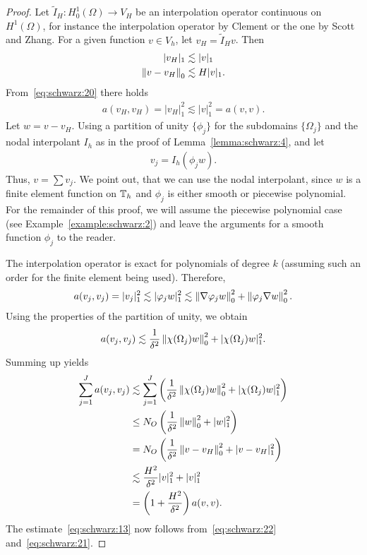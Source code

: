 \begin{proof}
  Let $\tilde I_H: H^1_0(\Omega) \to V_H$ be an interpolation operator
  continuous on $H^1(\Omega)$, for instance the interpolation operator
  by Clement or the one by Scott and Zhang. For a given function
  $v\in V_h$, let $v_H = \tilde I_H v$. Then
  \begin{gather}
    \label{eq:schwarz:20}
    \begin{split}
      |v_H|_1 &\lesssim |v|_1 \\
      \left\|v-v_H\right\|_0 &\lesssim H |v|_1.
    \end{split}
  \end{gather}
  From~\eqref{eq:schwarz:20} there holds
  \begin{gather}
    \label{eq:schwarz:22}
    a(v_H,v_H) = |v_H|_1^2 \lesssim |v|_1^2 = a(v,v).
  \end{gather}
  Let $w=v-v_H$. Using a partition of unity $\{\phi_j\}$ for the
  subdomains $\{\Omega_j\}$ and the nodal interpolant $I_h$ as in the
  proof of Lemma~\ref{lemma:schwarz:4}, and let
  \begin{gather*}
    v_j = I_h(\phi_j w).
  \end{gather*}
  Thus, $v = \sum v_j$. We point out, that we can use the nodal
  interpolant, since $w$ is a finite element function on $\mathbb T_h$ and
  $\phi_j$ is either smooth or piecewise polynomial. For the remainder
  of this proof, we will assume the piecewise polynomial case (see
  Example~\ref{example:schwarz:2}) and leave the arguments for a
  smooth function $\phi_j$ to the reader.
  
  The interpolation operator is exact for polynomials of degree $k$
  (assuming such an order for the finite element being
  used). Therefore,
  \begin{gather*}
    a(v_j,v_j) = |v_j|_1^2 \lesssim |\varphi_j w|_1^2
    \lesssim \left\|\nabla \varphi_j w\right\|_0^2 + \left\|\varphi_j \nabla w\right\|_0^2.
  \end{gather*}
  Using the properties of the partition of unity, we obtain
  \begin{gather*}
    a(v_j,v_j) \lesssim \frac1{\delta^2} \left\|\chi(\Omega_j) w\right\|_0^2
    + |\chi(\Omega_j)w|_1^2.
  \end{gather*}
  Summing up yields
  \begin{gather}
    \label{eq:schwarz:21}
    \begin{split}
      \sum_{j=1}^J a(v_j, v_j)
      &\lesssim \sum_{j=1}^J \left(
        \frac1{\delta^2} \left\|\chi(\Omega_j) w\right\|_0^2
        + |\chi(\Omega_j)w|_1^2\right) \\
      &\le N_O \left(\frac1{\delta^2}\left\|w\right\|_0^2 + |w|_1^2\right) \\
      &=  N_O \left(\frac1{\delta^2} \left\|v-v_H\right\|_0^2 + |v-v_H|_1^2\right)
      \\
      & \lesssim \frac{H^2}{\delta^2} |v|_1^2 + |v|_1^2 \\
      &= \left(1+\frac{H^2}{\delta^2}\right) a(v,v).      
    \end{split}
  \end{gather}
  The estimate~\eqref{eq:schwarz:13} now follows
  from~\eqref{eq:schwarz:22} and~\eqref{eq:schwarz:21}.
\end{proof}

